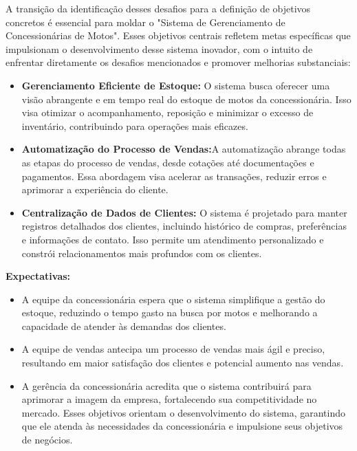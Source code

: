 A transição da identificação desses desafios para a definição de objetivos concretos é essencial para moldar o "Sistema de Gerenciamento de Concessionárias de Motos". Esses objetivos centrais refletem metas específicas que impulsionam o desenvolvimento desse sistema inovador, com o intuito de enfrentar diretamente os desafios mencionados e promover melhorias substanciais:
\begin{itemize}
\item\textbf{Gerenciamento Eficiente de Estoque:} O sistema busca oferecer uma visão abrangente e em tempo real do estoque de motos da concessionária. Isso visa otimizar o acompanhamento, reposição e minimizar o excesso de inventário, contribuindo para operações mais eficazes.

\item\textbf{Automatização do Processo de Vendas:}A automatização abrange todas as etapas do processo de vendas, desde cotações até documentações e pagamentos. Essa abordagem visa acelerar as transações, reduzir erros e aprimorar a experiência do cliente.

\item\textbf{Centralização de Dados de Clientes:} O sistema é projetado para manter registros detalhados dos clientes, incluindo histórico de compras, preferências e informações de contato. Isso permite um atendimento personalizado e constrói relacionamentos mais profundos com os clientes.\\
\end{itemize}


\textbf{Expectativas:}
\begin{itemize}
	\item A equipe da concessionária espera que o sistema simplifique a gestão do estoque, reduzindo o tempo gasto na busca por motos e melhorando a capacidade de atender às demandas dos clientes.
	
	\item A equipe de vendas antecipa um processo de vendas mais ágil e preciso, resultando em maior satisfação dos clientes e potencial aumento nas vendas.
	
	\item A gerência da concessionária acredita que o sistema contribuirá para aprimorar a imagem da empresa, fortalecendo sua competitividade no mercado. Esses objetivos orientam o desenvolvimento do sistema, garantindo que ele atenda às necessidades da concessionária e impulsione seus objetivos de negócios.
\end{itemize}


